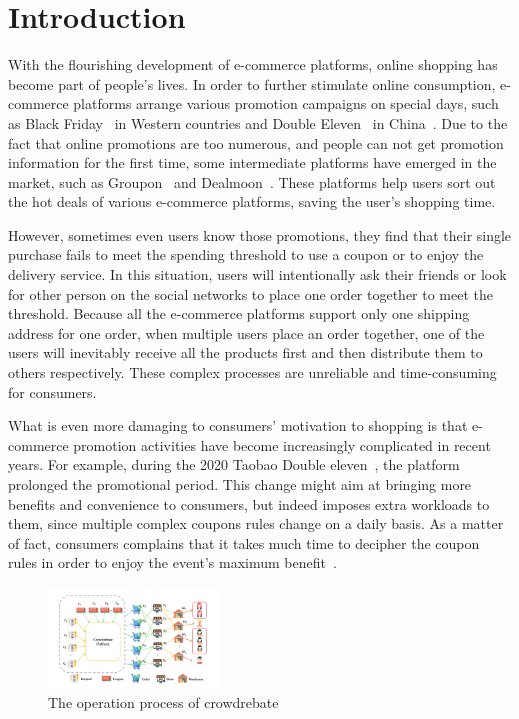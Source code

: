 \section{Introduction}

With the flourishing development of e-commerce platforms, online shopping has become part of people's lives. In order to further stimulate online consumption, e-commerce platforms arrange various promotion campaigns on special days, such as Black Friday~\cite{2013Black} in Western countries and Double Eleven~\cite{double11} in China~\cite{huang2019x}. Due to the fact that online promotions are too numerous, and people can not get promotion information for the first time, some intermediate platforms have emerged in the market, such as Groupon~\cite{groupon} and Dealmoon~\cite{dealmoon}. These platforms help users sort out the hot deals of various e-commerce platforms, saving the user's shopping time.

However, sometimes even users know those promotions, they find that their single purchase fails to meet the spending threshold to use a coupon or to enjoy the delivery service. In this situation, users will intentionally ask their friends or look for other person on the social networks to place one order together to meet the threshold. Because all the e-commerce platforms support only one shipping address for one order, when multiple users place an order together, one of the users will inevitably receive all the products first and then distribute them to others respectively. These complex processes are unreliable and time-consuming for consumers. 

What is even more damaging to consumers' motivation to shopping is that e-commerce promotion activities have become increasingly complicated in recent years. For example, during the 2020 Taobao Double eleven~\cite{2020}, the platform prolonged the promotional period. This change might aim at bringing more benefits and convenience to consumers, but indeed imposes extra workloads to them, since multiple complex coupons rules change on a daily basis. As a matter of fact, consumers complains that it takes much time to decipher the coupon rules in order to enjoy the event's maximum benefit~\cite{double2020}.
\begin{figure}[t] 
\centering %
		\includegraphics[width=0.4\textwidth]{../figure/crowdrebate process.png} %
	\caption{The operation process of crowdrebate} %
	\label{fig:Crowdrebate} %
	\end{figure}


